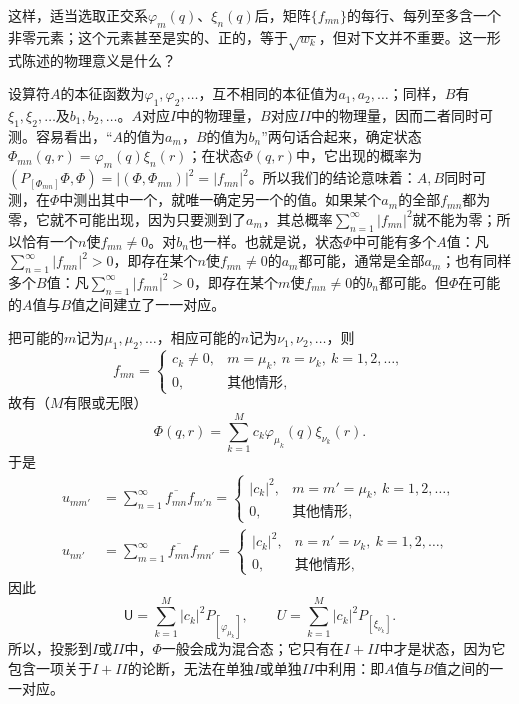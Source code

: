 \documentclass[fontsize=13pt,twoside,openany,headings=normal,parskip=false,bookmarkpackage=false,DIV=calc]{scrbook}
\begin{document}
这样，适当选取正交系$\varphi_m(q)$、$\xi_n(q)$后，矩阵$\{f_{mn}\}$的每行、每列至多含一个非零元素；这个元素甚至是实的、正的，等于$\sqrt{w_k}$，但对下文并不重要。这一形式陈述的物理意义是什么？

设算符$A$的本征函数为$\varphi_1,\allowbreak \varphi_2,\allowbreak \ldots$，互不相同的本征值为$a_1,\allowbreak a_2,\allowbreak \ldots$；同样，$B$有$\xi_1,\allowbreak \xi_2,\allowbreak \ldots$及$b_1,\allowbreak b_2,\allowbreak \ldots$。$A$对应$I$中的物理量，$B$对应$II$中的物理量，因而二者同时可测。容易看出，“$A$的值为$a_m$，$B$的值为$b_n$”两句话合起来，确定状态$\Phi_{mn}(q,\allowbreak r)=\varphi_m(q)\xi_n(r)$；在状态$\Phi(q,\allowbreak r)$中，它出现的概率为$(P_{[\Phi_{mn}]}\Phi,\allowbreak \Phi)=|(\Phi,\allowbreak \Phi_{mn})|^2=|f_{mn}|^2$。所以我们的结论意味着：$A,\allowbreak B$同时可测，在$\Phi$中测出其中一个，就唯一确定另一个的值。如果某个$a_m$的全部$f_{mn}$都为零，它就不可能出现，因为只要测到了$a_m$，其总概率$\sum_{n=1}^{\infty}|f_{mn}|^2$就不能为零；所以恰有一个$n$使$f_{mn}\ne0$。对$b_n$也一样。也就是说，状态$\Phi$中可能有多个$A$值：凡$\sum_{n=1}^{\infty}|f_{mn}|^2>0$，即存在某个$n$使$f_{mn}\ne0$的$a_m$都可能，通常是全部$a_m$；也有同样多个$B$值：凡$\sum_{n=1}^{\infty}|f_{mn}|^2>0$，即存在某个$m$使$f_{mn}\ne0$的$b_n$都可能。但$\Phi$在可能的$A$值与$B$值之间建立了一一对应。

\hypertarget{origpage-232}{}\label{origpage-232}把可能的$m$记为$\mu_1,\allowbreak \mu_2,\allowbreak \ldots$，相应可能的$n$记为$\nu_1,\allowbreak \nu_2,\allowbreak \ldots$，则
\[
 f_{mn}=\begin{cases}c_k\ne0,&m=\mu_k,\ n=\nu_k,\ k=1,2,\ldots,\\
 0,&\text{其他情形},\end{cases}
\]
故有（$M$有限或无限）
\[
 \Phi(q,r)=\sum_{k=1}^{M}c_k\varphi_{\mu_k}(q)\xi_{\nu_k}(r).
\]
于是
\begin{align*}
 u_{mm'}&=\sum_{n=1}^{\infty}\overline{f_{mn}}f_{m'n}
 =\begin{cases}|c_k|^2,&m=m'=\mu_k,\ k=1,2,\ldots,\\0,&\text{其他情形},\end{cases}\\
 u_{nn'}&=\sum_{m=1}^{\infty}\overline{f_{mn}}f_{mn'}
 =\begin{cases}|c_k|^2,&n=n'=\nu_k,\ k=1,2,\ldots,\\0,&\text{其他情形},\end{cases}
\end{align*}
因此
\[
 \mathsf U=\sum_{k=1}^{M}|c_k|^2P_{[\varphi_{\mu_k}]},\qquad
 U=\sum_{k=1}^{M}|c_k|^2P_{[\xi_{\nu_k}]}.
\]
所以，投影到$I$或$II$中，$\Phi$一般会成为混合态；它只有在$I+II$中才是状态，因为它包含一项关于$I+II$的论断，无法在单独$I$或单独$II$中利用：即$A$值与$B$值之间的一一对应。
\end{document}
